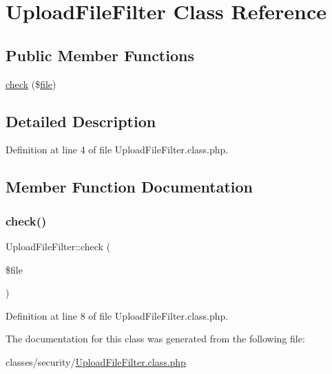 \hypertarget{classUploadFileFilter}{}\section{Upload\+File\+Filter Class Reference}
\label{classUploadFileFilter}
\subsection*{Public Member Functions}
\begin{DoxyCompactItemize}
\item 
\hyperlink{classUploadFileFilter_a9032ac1f53f2e216125b53c4988adf6b}{check} (\$\hyperlink{classfile}{file})
\end{DoxyCompactItemize}


\subsection{Detailed Description}


Definition at line 4 of file Upload\+File\+Filter.\+class.\+php.



\subsection{Member Function Documentation}
\hypertarget{classUploadFileFilter_a9032ac1f53f2e216125b53c4988adf6b}{}\label{classUploadFileFilter_a9032ac1f53f2e216125b53c4988adf6b} 
\subsubsection{\texorpdfstring{check()}{check()}}
{\footnotesize\ttfamily Upload\+File\+Filter\+::check (\begin{DoxyParamCaption}\item[{}]{\$file }\end{DoxyParamCaption})}



Definition at line 8 of file Upload\+File\+Filter.\+class.\+php.



The documentation for this class was generated from the following file\+:\begin{DoxyCompactItemize}
\item 
classes/security/\hyperlink{UploadFileFilter_8class_8php}{Upload\+File\+Filter.\+class.\+php}\end{DoxyCompactItemize}
